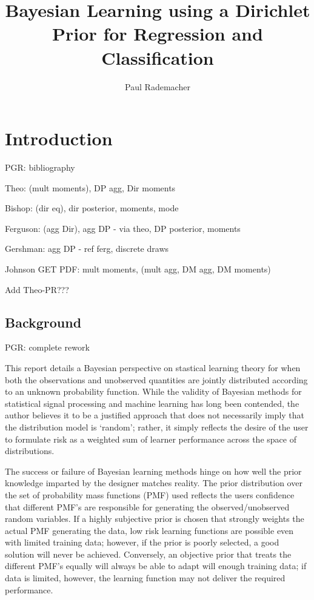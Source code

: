 \documentclass[12pt]{report}
\title{Bayesian Learning using a Dirichlet Prior for Regression and Classification}
\author{Paul Rademacher}
\begin{document}
\maketitle
\tableofcontents

\chapter{Introduction}


PGR: bibliography

Theo: (mult moments), DP agg, Dir moments

Bishop: (dir eq), dir posterior, moments, mode

Ferguson: (agg Dir), agg DP - via theo, DP posterior, moments

Gershman: agg DP - ref ferg, discrete draws

Johnson GET PDF: mult moments, (mult agg, DM agg, DM moments)

Add Theo-PR???




\section{Background}

PGR: complete rework

This report details a Bayesian perspective on stastical learning theory for when both the observations and unobserved quantities are jointly distributed according to an unknown probability function. While the validity of Bayesian methods for statistical signal processing and machine learning has long been contended, the author believes it to be a justified approach that does not necessarily imply that the distribution model is `random'; rather, it simply reflects the desire of the user to formulate risk as a weighted sum of learner performance across the space of distributions. 

The success or failure of Bayesian learning methods hinge on how well the prior knowledge imparted by the designer matches reality. The prior distribution over the set of probability mass functions (PMF) used reflects the users confidence that different PMF's are responsible for generating the observed/unobserved random variables. If a highly subjective prior is chosen that strongly weights the actual PMF generating the data, low risk learning functions are possible even with limited training data; however, if the prior is poorly selected, a good solution will never be achieved. Conversely, an objective prior that treats the different PMF's equally will always be able to adapt will enough training data; if data is limited, however, the learning function may not deliver the required performance.
\end{document}
